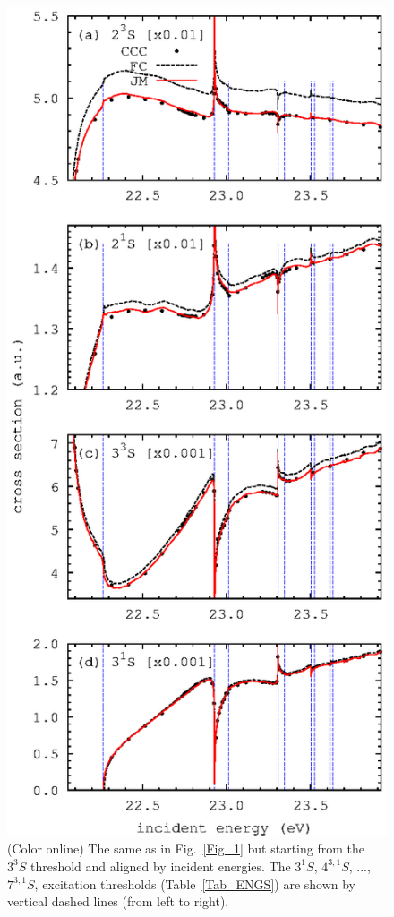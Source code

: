 \documentclass[aip
, pra
, showpacs
, aps
, twocolumn
, groupedaddress
, floatfix
]{revtex4}
\begin{document}
\begin{figure}[htb]
\includegraphics[scale=1]{fig3.ps}
\caption{(Color online)
The same as in Fig.~\ref{Fig_1} but starting from the $3^3S$ threshold
and aligned by incident energies. The $3^1S$, $4^{3,1}S$, ..., $7^{3,1}S$, excitation thresholds (Table~\ref{Tab_ENGS})
are shown by vertical dashed lines (from left to right).
}
\label{Fig_3}
\end{figure}
\end{document}
